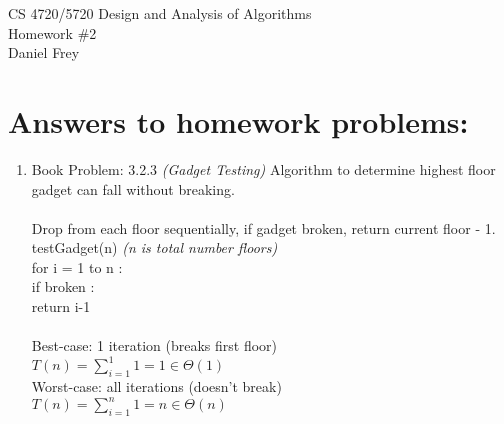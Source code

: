\documentclass[11pt]{article}
\begin{document}
 

\rhead{\today}

\begin{center}\begin{Large}
CS 4720/5720 Design and Analysis of Algorithms \\
Homework \#2 \\
Daniel Frey
\end{Large}
\end{center}


\section*{Answers to homework problems:}

\begin{enumerate}
	\item Book Problem: 3.2.3 \textit{(Gadget Testing)} 
		 Algorithm to determine highest floor gadget can fall without breaking. \\\\
		 Drop from each floor sequentially, if gadget broken, return current floor - 1. \\
		 testGadget(n) \textit{(n is total number floors)} \\
			\hspace*{.4cm}
			for i = 1 to n : \\
				\hspace*{.8cm}
				if broken : \\
					\hspace*{1.2cm}
					return i-1 \\\\
		 Best-case: 1 iteration (breaks first floor) \\
		 	\hspace*{.4cm}
		 	$ T(n)= \sum_{i=1}^{1}1 = 1 \in \Theta(1) $ \\
		  Worst-case: all iterations (doesn't break) \\
		  	\hspace*{.4cm}
		  	$ T(n)= \sum_{i=1}^{n}1 = n \in \Theta(n) $ \\


\end{enumerate}
\end{document}
